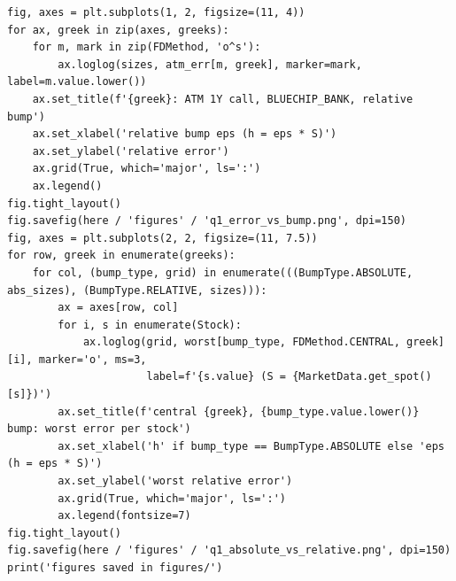 \documentclass[11pt,a4paper]{article}
\begin{document}
\begin{lstlisting}[style=pysmall]
fig, axes = plt.subplots(1, 2, figsize=(11, 4))
for ax, greek in zip(axes, greeks):
    for m, mark in zip(FDMethod, 'o^s'):
        ax.loglog(sizes, atm_err[m, greek], marker=mark, label=m.value.lower())
    ax.set_title(f'{greek}: ATM 1Y call, BLUECHIP_BANK, relative bump')
    ax.set_xlabel('relative bump eps (h = eps * S)')
    ax.set_ylabel('relative error')
    ax.grid(True, which='major', ls=':')
    ax.legend()
fig.tight_layout()
fig.savefig(here / 'figures' / 'q1_error_vs_bump.png', dpi=150)
fig, axes = plt.subplots(2, 2, figsize=(11, 7.5))
for row, greek in enumerate(greeks):
    for col, (bump_type, grid) in enumerate(((BumpType.ABSOLUTE, abs_sizes), (BumpType.RELATIVE, sizes))):
        ax = axes[row, col]
        for i, s in enumerate(Stock):
            ax.loglog(grid, worst[bump_type, FDMethod.CENTRAL, greek][i], marker='o', ms=3,
                      label=f'{s.value} (S = {MarketData.get_spot()[s]})')
        ax.set_title(f'central {greek}, {bump_type.value.lower()} bump: worst error per stock')
        ax.set_xlabel('h' if bump_type == BumpType.ABSOLUTE else 'eps (h = eps * S)')
        ax.set_ylabel('worst relative error')
        ax.grid(True, which='major', ls=':')
        ax.legend(fontsize=7)
fig.tight_layout()
fig.savefig(here / 'figures' / 'q1_absolute_vs_relative.png', dpi=150)
print('figures saved in figures/')
\end{lstlisting}
\end{document}

